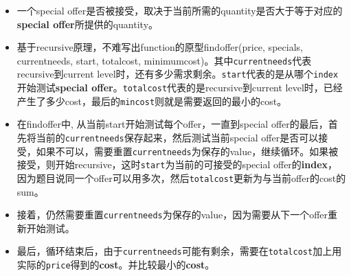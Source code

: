 \documentclass[a4paper,12pt]{article}
\begin{document}
\begin{CJK*}{UTF8}{gbsn}
	\begin{itemize}
		\item 一个special offer是否被接受，取决于当前所需的quantity是否大于等于对应的\textbf{special offer}所提供的quantity。
		\item 基于recursive原理，不难写出function的原型find\textunderscore offer(price, specials, current\textunderscore needs, start, total\textunderscore cost, minimum\textunderscore cost)。其中\texttt{current\textunderscore needs}代表recursive到current level时，还有多少需求剩余。\texttt{start}代表的是从哪个\texttt{index}开始测试\textbf{special offer}。\texttt{total\textunderscore cost}代表的是recursive到current level时，已经产生了多少cost，最后的\texttt{min\textunderscore cost}则就是需要返回的最小的cost。
		\item 在find\textunderscore offer中, 从当前start开始测试每个offer，一直到special offer的最后，首先将当前的\texttt{current\textunderscore needs}保存起来，然后测试当前special offer是否可以接受，如果不可以，需要重置\texttt{current\textunderscore needs}为保存的value，继续循环。如果被接受，则开始recursive，这时\texttt{start}为当前的可接受的special offer的\textbf{index}，因为题目说同一个offer可以用多次，然后\texttt{total\textunderscore cost}更新为与当前offer的cost的sum。
		\item 接着，仍然需要重置\texttt{current\textunderscore needs}为保存的value，因为需要从下一个offer重新开始测试。
		\item 最后，循环结束后，由于\texttt{current\textunderscore needs}可能有剩余，需要在\texttt{total\textunderscore cost}加上用实际的\texttt{price}得到的\textbf{cost}。并比较最小的\textbf{cost}。
	\end{itemize}
	\clearpage
\end{CJK*}
\end{document}
